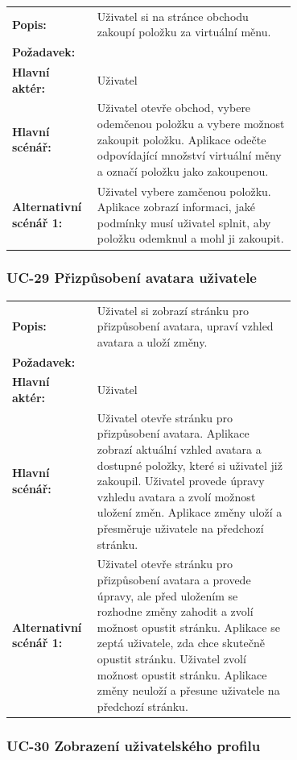 \begin{tabular}{lp{0.7\linewidth}}
  \textbf{Popis:} & Uživatel si na stránce obchodu zakoupí položku za virtuální měnu. \\
  \textbf{Požadavek:} & \nameref{sec:fp-shop-unlock-items} \\
  \textbf{Hlavní aktér:} & Uživatel \\
  \textbf{Hlavní scénář:} & Uživatel otevře obchod, vybere odemčenou položku a vybere možnost zakoupit položku. Aplikace odečte odpovídající množství virtuální měny a označí položku jako zakoupenou. \\
  \textbf{Alternativní scénář 1:} & Uživatel vybere zamčenou položku. Aplikace zobrazí informaci, jaké podmínky musí uživatel splnit, aby položku odemknul a mohl ji zakoupit. \\
\end{tabular}

\subsubsection{UC-29 Přizpůsobení avatara uživatele}

\begin{tabular}{lp{0.7\linewidth}}
  \textbf{Popis:} & Uživatel si zobrazí stránku pro přizpůsobení avatara, upraví vzhled avatara a uloží změny. \\
  \textbf{Požadavek:} & \nameref{sec:fp-avatar-customization} \\
  \textbf{Hlavní aktér:} & Uživatel \\
  \textbf{Hlavní scénář:} & Uživatel otevře stránku pro přizpůsobení avatara. Aplikace zobrazí aktuální vzhled avatara a dostupné položky, které si uživatel již zakoupil. Uživatel provede úpravy vzhledu avatara a zvolí možnost uložení změn. Aplikace změny uloží a přesměruje uživatele na předchozí stránku. \\
  \textbf{Alternativní scénář 1:} & Uživatel otevře stránku pro přizpůsobení avatara a provede úpravy, ale před uložením se rozhodne změny zahodit a zvolí možnost opustit stránku. Aplikace se zeptá uživatele, zda chce skutečně opustit stránku. Uživatel zvolí možnost opustit stránku. Aplikace změny neuloží a přesune uživatele na předchozí stránku. \\
\end{tabular}

\subsubsection{UC-30 Zobrazení uživatelského profilu}

